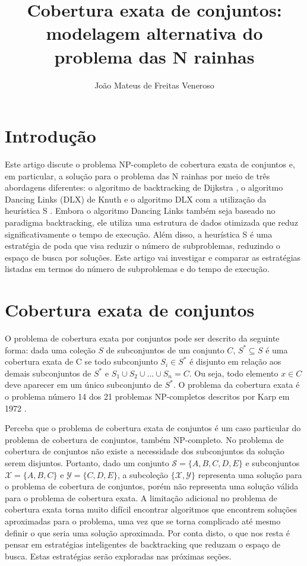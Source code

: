 \documentclass{article}
\begin{document}
\title{Cobertura exata de conjuntos: modelagem alternativa do problema das N rainhas}
\author{João Mateus de Freitas Veneroso}

\maketitle

\section{Introdução}

Este artigo discute o problema NP-completo de cobertura exata de conjuntos e, em particular,
a solução para o problema das N rainhas por meio de três abordagens diferentes: 
o algoritmo de backtracking de Dijkstra \cite{dijkstra1972}, o algoritmo Dancing Links (DLX) de Knuth e o algoritmo
DLX com a utilização da heurística S \cite{knuth2000}. Embora o algoritmo Dancing Links também seja baseado no paradigma
backtracking, ele utiliza uma estrutura de dados otimizada que reduz significativamente 
o tempo de execução. Além disso, a heurística S é uma estratégia de poda que visa reduzir o número de 
subproblemas, reduzindo o espaço de busca por soluções. Este artigo vai investigar e comparar as
estratégias listadas em termos do número de subproblemas e do tempo de execução.

\section{Cobertura exata de conjuntos}

O problema de cobertura exata por conjuntos pode ser descrito da seguinte forma: 
dada uma coleção $ S $ de subconjuntos de um conjunto $ C $, $ S^* \subseteq S $ é uma cobertura exata de C se 
todo subconjunto $S_i \in S^*$ é disjunto em relação aos demais subconjuntos de $ S^* $ e $ S_1 \cup S_2 \cup ... \cup S_n = C $. Ou
seja, todo elemento $ x \in C $ deve aparecer em um único subconjunto de $ S^* $. O problema da 
cobertura exata é o problema número 14 dos 21 problemas NP-completos descritos por Karp em 1972 \cite{karp1972}.

Perceba que o problema de cobertura exata de conjuntos é um caso particular do problema de cobertura de conjuntos, também
NP-completo. No problema de cobertura de conjuntos não existe a necessidade dos subconjuntos da solução serem disjuntos.
Portanto, dado um conjunto $ \mathcal{S} = \{ A, B, C, D, E \} $ e subconjuntos $ \mathcal{X} = \{ A, B, C \} $ e 
$ \mathcal{Y} = \{ C, D, E \} $, a subcoleção
$ \{ \mathcal{X}, \mathcal{Y} \} $ representa uma solução para o problema de cobertura de conjuntos, porém não representa uma solução válida para 
o problema de cobertura exata. A limitação adicional no problema de cobertura exata torna muito difícil encontrar 
algoritmos que encontrem soluções aproximadas para o problema, uma vez que se torna complicado até mesmo definir o que 
seria uma solução aproximada. Por conta disto, o que nos resta é pensar em estratégias inteligentes
de backtracking que reduzam o espaço de busca. Estas estratégias serão exploradas nas próximas seções.
\end{document}
